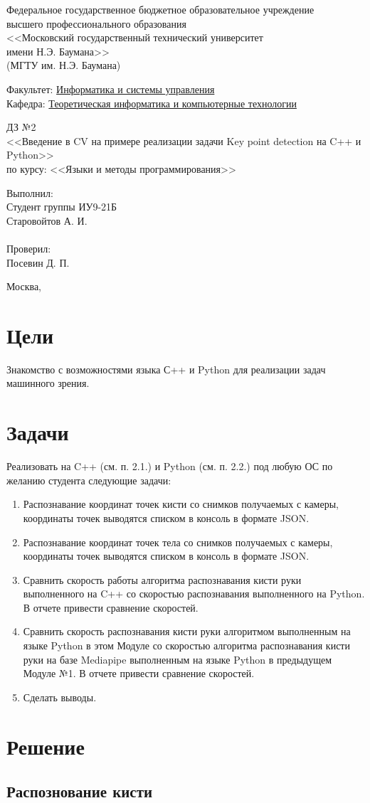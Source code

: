 \documentclass[
  12pt,
  a4paper,
]{article}
\providecommand{\tightlist}{%
  \setlength{\itemsep}{0pt}\setlength{\parskip}{0pt}}
\newcommand{\thetitle}{Введение в CV на примере реализации задачи Key
point detection на C++ и Python}
\newcommand{\theauthor}{Старовойтов А. И.}
\newcommand{\theteacher}{Посевин Д. П.}
\newcommand{\thegroup}{ИУ9-21Б}
\newcommand{\thecourse}{Языки и методы программирования}
\newcommand{\thenumber}{2}
\renewcommand{\maketitle}
{
\newgeometry{
  left=0.7in,
  right=0.7in,
}
\begin{titlepage}
    \centering
    Федеральное государственное бюджетное образовательное учреждение\\
    высшего профессионального образования\\
    <<Московский государственный технический университет\\
    имени Н.Э. Баумана>>\\
    (МГТУ им. Н.Э. Баумана)
    \vspace{1cm}

    \flushleft

    Факультет: \underline{Информатика и системы управления}\\
    Кафедра: \underline{Теоретическая информатика и компьютерные технологии}

    \centering
    \topskip0pt
    \vspace*{\fill}
    ДЗ №\thenumber{}\\
    <<\thetitle{}>>\\
    по курсу: <<\thecourse{}>>
    \vspace*{\fill}
    \centering


    \hfill\begin{minipage}{0.4\linewidth}
        Выполнил:\\
        Студент группы \thegroup{}\\
        \theauthor\\
        \\
        Проверил:\\
        \theteacher
    \end{minipage}

    \vfill

    Москва, \the\year{}

\end{titlepage}
\restoregeometry{}
}
\begin{document}
\maketitle

\hypertarget{ux446ux435ux43bux438}{%
\section{Цели}\label{ux446ux435ux43bux438}}

Знакомство с возможностями языка С++ и Python для реализации задач
машинного зрения.

\hypertarget{ux437ux430ux434ux430ux447ux438}{%
\section{Задачи}\label{ux437ux430ux434ux430ux447ux438}}

Реализовать на C++ (см. п. 2.1.) и Python (см. п. 2.2.) под любую ОС по
желанию студента следующие задачи:

\begin{enumerate}
\def\labelenumi{\arabic{enumi}.}
\tightlist
\item
  Распознавание координат точек кисти со снимков получаемых с камеры,
  координаты точек выводятся списком в консоль в формате JSON.
\item
  Распознавание координат точек тела со снимков получаемых с камеры,
  координаты точек выводятся списком в консоль в формате JSON.
\item
  Сравнить скорость работы алгоритма распознавания кисти руки
  выполненного на C++ со скоростью распознавания выполненного на Python.
  В отчете привести сравнение скоростей.
\item
  Сравнить скорость распознавания кисти руки алгоритмом выполненным на
  языке Python в этом Модуле со скоростью алгоритма распознавания кисти
  руки на базе Mediapipe выполненным на языке Python в предыдущем Модуле
  №1. В отчете привести сравнение скоростей.
\item
  Сделать выводы.
\end{enumerate}

\hypertarget{ux440ux435ux448ux435ux43dux438ux435}{%
\section{Решение}\label{ux440ux435ux448ux435ux43dux438ux435}}

\hypertarget{ux440ux430ux441ux43fux43eux437ux43dux43eux432ux430ux43dux438ux435-ux43aux438ux441ux442ux438}{%
\subsection{Распознование
кисти}\label{ux440ux430ux441ux43fux43eux437ux43dux43eux432ux430ux43dux438ux435-ux43aux438ux441ux442ux438}}
\end{document}
